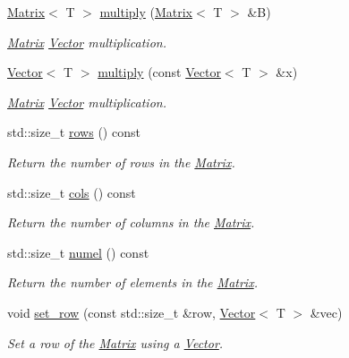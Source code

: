 \begin{DoxyCompactItemize}
\hyperlink{classLuna_1_1Matrix}{Matrix}$<$ T $>$ \hyperlink{classLuna_1_1Matrix_a0a55d0f67f6fdfc33f13e0d89225617d}{multiply} (\hyperlink{classLuna_1_1Matrix}{Matrix}$<$ T $>$ \&B)
\begin{DoxyCompactList}\small\item\em \hyperlink{classLuna_1_1Matrix}{Matrix} \hyperlink{classLuna_1_1Vector}{Vector} multiplication. \end{DoxyCompactList}\item 
\hyperlink{classLuna_1_1Vector}{Vector}$<$ T $>$ \hyperlink{classLuna_1_1Matrix_aa7169bd89ea8e76cd5a38e3d2d5b2879}{multiply} (const \hyperlink{classLuna_1_1Vector}{Vector}$<$ T $>$ \&x)
\begin{DoxyCompactList}\small\item\em \hyperlink{classLuna_1_1Matrix}{Matrix} \hyperlink{classLuna_1_1Vector}{Vector} multiplication. \end{DoxyCompactList}\item 
std\+::size\+\_\+t \hyperlink{classLuna_1_1Matrix_ae7b0b30c3e22ba252d660f093757295e}{rows} () const
\begin{DoxyCompactList}\small\item\em Return the number of rows in the \hyperlink{classLuna_1_1Matrix}{Matrix}. \end{DoxyCompactList}\item 
std\+::size\+\_\+t \hyperlink{classLuna_1_1Matrix_aa7472f90f4c470535e722f3a389a19b1}{cols} () const
\begin{DoxyCompactList}\small\item\em Return the number of columns in the \hyperlink{classLuna_1_1Matrix}{Matrix}. \end{DoxyCompactList}\item 
std\+::size\+\_\+t \hyperlink{classLuna_1_1Matrix_a2e697f673d6bc9b38dc1a07bac56aac5}{numel} () const
\begin{DoxyCompactList}\small\item\em Return the number of elements in the \hyperlink{classLuna_1_1Matrix}{Matrix}. \end{DoxyCompactList}\item 
void \hyperlink{classLuna_1_1Matrix_aa276b72f2edfc8bb280ca051177b4536}{set\+\_\+row} (const std\+::size\+\_\+t \&row, \hyperlink{classLuna_1_1Vector}{Vector}$<$ T $>$ \&vec)
\begin{DoxyCompactList}\small\item\em Set a row of the \hyperlink{classLuna_1_1Matrix}{Matrix} using a \hyperlink{classLuna_1_1Vector}{Vector}. \end{DoxyCompactList}\item 

\end{DoxyCompactItemize}

